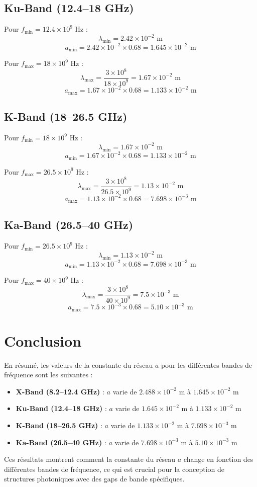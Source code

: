 \documentclass{article}
\begin{document}
\subsection{Ku-Band (12.4–18 GHz)}
Pour \( f_{\text{min}} = 12.4 \times 10^9 \) Hz :
\[
\lambda_{\text{min}} = 2.42 \times 10^{-2} \text{ m}
\]
\[
a_{\text{min}} = 2.42 \times 10^{-2} \times 0.68 = 1.645 \times 10^{-2} \text{ m}
\]

Pour \( f_{\text{max}} = 18 \times 10^9 \) Hz :
\[
\lambda_{\text{max}} = \frac{3 \times 10^8}{18 \times 10^9} = 1.67 \times 10^{-2} \text{ m}
\]
\[
a_{\text{max}} = 1.67 \times 10^{-2} \times 0.68 = 1.133 \times 10^{-2} \text{ m}
\]

\subsection{K-Band (18–26.5 GHz)}
Pour \( f_{\text{min}} = 18 \times 10^9 \) Hz :
\[
\lambda_{\text{min}} = 1.67 \times 10^{-2} \text{ m}
\]
\[
a_{\text{min}} = 1.67 \times 10^{-2} \times 0.68 = 1.133 \times 10^{-2} \text{ m}
\]

Pour \( f_{\text{max}} = 26.5 \times 10^9 \) Hz :
\[
\lambda_{\text{max}} = \frac{3 \times 10^8}{26.5 \times 10^9} = 1.13 \times 10^{-2} \text{ m}
\]
\[
a_{\text{max}} = 1.13 \times 10^{-2} \times 0.68 = 7.698 \times 10^{-3} \text{ m}
\]

\subsection{Ka-Band (26.5–40 GHz)}
Pour \( f_{\text{min}} = 26.5 \times 10^9 \) Hz :
\[
\lambda_{\text{min}} = 1.13 \times 10^{-2} \text{ m}
\]
\[
a_{\text{min}} = 1.13 \times 10^{-2} \times 0.68 = 7.698 \times 10^{-3} \text{ m}
\]

Pour \( f_{\text{max}} = 40 \times 10^9 \) Hz :
\[
\lambda_{\text{max}} = \frac{3 \times 10^8}{40 \times 10^9} = 7.5 \times 10^{-3} \text{ m}
\]
\[
a_{\text{max}} = 7.5 \times 10^{-3} \times 0.68 = 5.10 \times 10^{-3} \text{ m}
\]

\section{Conclusion}
En résumé, les valeurs de la constante du réseau \( a \) pour les différentes bandes de fréquence sont les suivantes :

\begin{itemize}
    \item \textbf{X-Band (8.2–12.4 GHz)} : \( a \) varie de \( 2.488 \times 10^{-2} \) m à \( 1.645 \times 10^{-2} \) m
    \item \textbf{Ku-Band (12.4–18 GHz)} : \( a \) varie de \( 1.645 \times 10^{-2} \) m à \( 1.133 \times 10^{-2} \) m
    \item \textbf{K-Band (18–26.5 GHz)} : \( a \) varie de \( 1.133 \times 10^{-2} \) m à \( 7.698 \times 10^{-3} \) m
    \item \textbf{Ka-Band (26.5–40 GHz)} : \( a \) varie de \( 7.698 \times 10^{-3} \) m à \( 5.10 \times 10^{-3} \) m
\end{itemize}

Ces résultats montrent comment la constante du réseau \( a \) change en fonction des différentes bandes de fréquence, ce qui est crucial pour la conception de structures photoniques avec des gaps de bande spécifiques.
\end{document}
